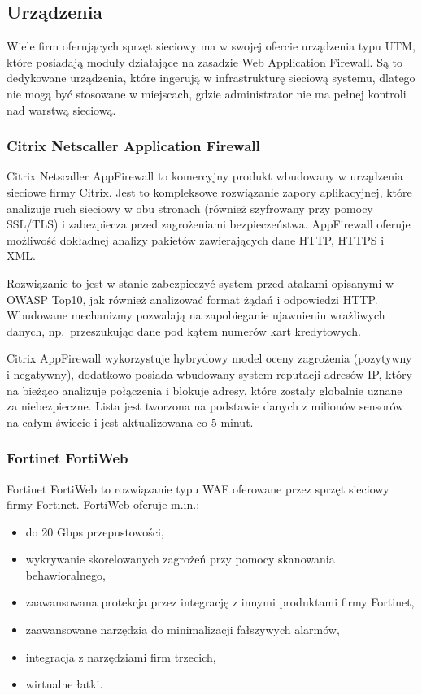 \documentclass[11pt,a4paper,polish,thesis]{dcsbook}
\begin{document}
\subsection{Urządzenia}
Wiele firm oferujących sprzęt sieciowy ma w swojej ofercie urządzenia typu UTM, które posiadają moduły działające na zasadzie Web Application Firewall. Są to dedykowane urządzenia, które ingerują w infrastrukturę sieciową systemu, dlatego nie mogą być stosowane w miejscach, gdzie administrator nie ma pełnej kontroli nad warstwą sieciową.

\subsubsection{Citrix Netscaller Application Firewall}
Citrix Netscaller AppFirewall \cite{citrix} to komercyjny produkt wbudowany w urządzenia sieciowe firmy Citrix. Jest to kompleksowe rozwiązanie zapory aplikacyjnej, które analizuje ruch sieciowy w obu stronach (również szyfrowany przy pomocy SSL/TLS) i zabezpiecza przed zagrożeniami bezpieczeństwa. AppFirewall oferuje możliwość dokładnej analizy pakietów zawierających dane HTTP, HTTPS i XML.

Rozwiązanie to jest w stanie zabezpieczyć system przed atakami opisanymi w OWASP Top10, jak również analizować format żądań i odpowiedzi HTTP. Wbudowane mechanizmy pozwalają na zapobieganie ujawnieniu wrażliwych danych, np.~przeszukując dane pod kątem numerów kart kredytowych.

Citrix AppFirewall wykorzystuje hybrydowy model oceny zagrożenia (pozytywny i negatywny), dodatkowo posiada wbudowany system reputacji adresów IP, który na bieżąco analizuje połączenia i blokuje adresy, które zostały globalnie uznane za niebezpieczne. Lista jest tworzona na podstawie danych z milionów sensorów na całym świecie i jest aktualizowana co 5 minut.

\subsubsection{Fortinet FortiWeb}
Fortinet FortiWeb \cite{fortiweb} to rozwiązanie typu WAF oferowane przez sprzęt sieciowy firmy Fortinet. FortiWeb oferuje m.in.:
\begin{itemize}
\item do 20 Gbps przepustowości,
\item wykrywanie skorelowanych zagrożeń przy pomocy skanowania behawioralnego,
\item zaawansowana protekcja przez integrację z innymi produktami firmy Fortinet,
\item zaawansowane narzędzia do minimalizacji fałszywych alarmów,
\item integracja z narzędziami firm trzecich,
\item wirtualne łatki.
\end{itemize}
\end{document}
